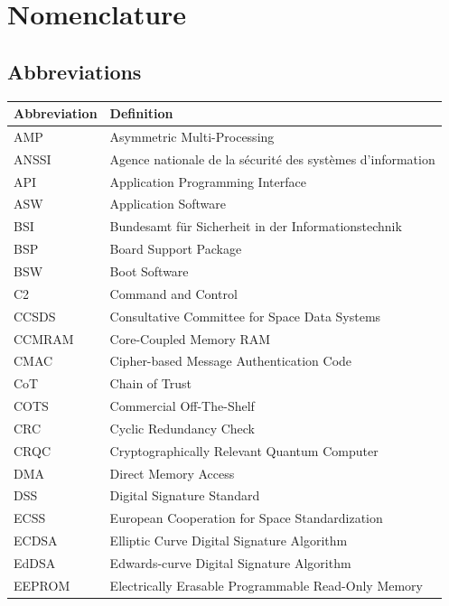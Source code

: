 \chapter*{Nomenclature}

\section*{Abbreviations}

\begin{longtable}{p{2.5cm}p{8cm}}
    \toprule
    Abbreviation & Definition \\
    \midrule\endhead %
    AMP     & Asymmetric Multi-Processing \\
    ANSSI   & Agence nationale de la sécurité des systèmes d'information \\
    API     & Application Programming Interface \\
    ASW     & Application Software \\
    BSI     & Bundesamt für Sicherheit in der Informationstechnik \\
    BSP     & Board Support Package \\
    BSW     & Boot Software \\
    C2      & Command and Control \\
    CCSDS   & Consultative Committee for Space Data Systems \\
    CCMRAM  & Core-Coupled Memory RAM \\
    CMAC    & Cipher-based Message Authentication Code \\
    CoT     & Chain of Trust \\
    COTS    & Commercial Off-The-Shelf \\
    CRC     & Cyclic Redundancy Check \\
    CRQC    & Cryptographically Relevant Quantum Computer \\
    DMA     & Direct Memory Access \\
    DSS     & Digital Signature Standard \\
    ECSS    & European Cooperation for Space Standardization \\
    ECDSA   & Elliptic Curve Digital Signature Algorithm \\
    EdDSA   & Edwards-curve Digital Signature Algorithm \\
    EEPROM  & Electrically Erasable Programmable Read-Only Memory \\

\end{longtable}
